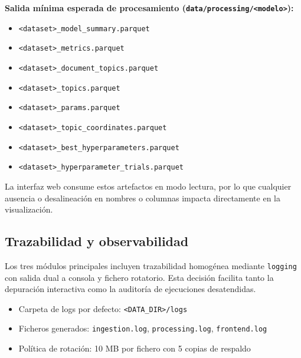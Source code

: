 \textbf{Salida mínima esperada de procesamiento (\texttt{data/processing/<modelo>}):}
\begin{itemize}
    \item \texttt{<dataset>\_model\_summary.parquet}
    \item \texttt{<dataset>\_metrics.parquet}
    \item \texttt{<dataset>\_document\_topics.parquet}
    \item \texttt{<dataset>\_topics.parquet}
    \item \texttt{<dataset>\_params.parquet}
    \item \texttt{<dataset>\_topic\_coordinates.parquet}
    \item \texttt{<dataset>\_best\_hyperparameters.parquet}
    \item \texttt{<dataset>\_hyperparameter\_trials.parquet}
\end{itemize}

La interfaz web consume estos artefactos en modo lectura, por lo que cualquier
ausencia o desalineación en nombres o columnas impacta directamente en la
visualización.

\subsection{Trazabilidad y observabilidad}
Los tres módulos principales incluyen trazabilidad homogénea mediante
\texttt{logging} con salida dual a consola y fichero rotatorio. Esta decisión
facilita tanto la depuración interactiva como la auditoría de ejecuciones
desatendidas.

\begin{itemize}
    \item Carpeta de logs por defecto: \texttt{<DATA\_DIR>/logs}
    \item Ficheros generados: \texttt{ingestion.log}, \texttt{processing.log},
          \texttt{frontend.log}
    \item Política de rotación: 10 MB por fichero con 5 copias de respaldo
\end{itemize}

